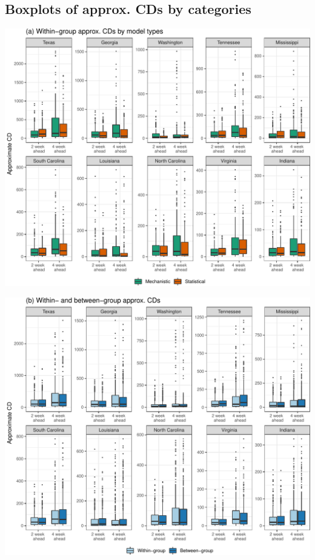 \documentclass[
]{article}
\begin{document}
\hypertarget{boxplots-of-approx.-cds-by-categories}{%
\subsection{Boxplots of approx. CDs by
categories}\label{boxplots-of-approx.-cds-by-categories}}

\begin{center}\includegraphics[width=1\linewidth,height=1\textheight]{multi_perm_analysis_files/figure-latex/box1-1} \end{center}

\begin{center}\includegraphics[width=1\linewidth,height=0.9\textheight]{multi_perm_analysis_files/figure-latex/box2-1} \end{center}
\end{document}
